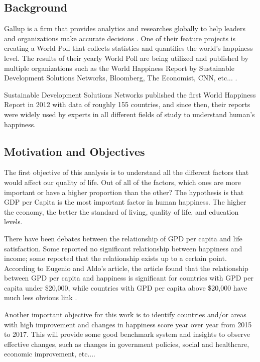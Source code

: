 \documentclass[11pt,twocolumn]{article}
\begin{document}
\subsection{Background}
Gallup is a firm that provides analytics and researches globally to help leaders and organizations make accurate decisions \cite{gallup} . One of their feature projects is creating a World Poll that collects statistics and quantifies the world's happiness level. The results of their yearly World Poll are being utilized and published by multiple organizations such as the World Happiness Report by Sustainable Development Solutions Networks, Bloomberg, The Economist, CNN, etc... \cite{gallup}.

Sustainable Development Solutions Networks published the first World Happiness Report in 2012 with data of roughly 155 countries, and since then, their reports were widely used by experts in all different fields of study to understand human's happiness. 


\subsection{Motivation and Objectives}

The first objective of this analysis is to understand all the different factors that would affect our quality of life. Out of all of the factors, which ones are more important or have a higher proportion than the other? The hypothesis is that GDP per Capita is the most important factor in human happiness. The higher the economy, the better the standard of living, quality of life, and education levels. 

There have been debates between the relationship of GPD per capita and life satisfaction. Some reported no significant relationship between happiness and income; some reported that the relationship exists up to a certain point. According to Eugenio and Aldo's article, the article found that the relationship between GPD per capita and happiness is significant for countries with GPD per capita under \$20,000, while countries with GPD per capita above \$20,000 have much less obvious link \cite{vox}.

Another important objective for this work is to identify countries and/or areas with high improvement and changes in happiness score year over year from 2015 to 2017. This will provide some good benchmark system and insights to observe effective changes, such as changes in government policies, social and healthcare, economic improvement, etc.... 
\end{document}
